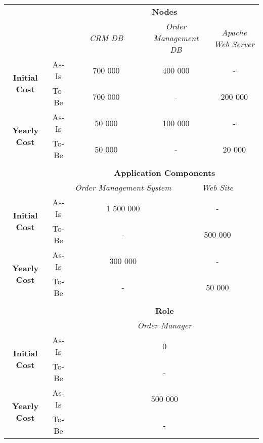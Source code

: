 \begin{table}[H]
	\centering
	\begin{tabular}{|c|c|p{2cm}|p{2.5cm}|p{2.5cm}|p{2.5cm}|}
		\cline{3-6}

		\multicolumn{2}{c}{} & \multicolumn{4}{|c|}{\textbf{Nodes}} \\ \cline{3-6}
		\multicolumn{2}{c|}{} & \multicolumn{1}{c|}{\textsl{CRM DB}} & \multicolumn{2}{c|}{\textsl{Order Management DB}}  & \multicolumn{1}{c|}{\textsl{Apache Web Server}}\\
		\hline
		\multirow{2}{*}{\textbf{Initial Cost}}& As-Is & \multicolumn{1}{c|}{700 000} & \multicolumn{2}{c|}{400 000} & \multicolumn{1}{c|}{-}  \\ \cline{2-6}
		& To-Be & \multicolumn{1}{c|}{700 000} & \multicolumn{2}{c|}{-} & \multicolumn{1}{c|}{200 000}  \\ \hline 
		\multirow{2}{*}{\textbf{Yearly Cost}}& As-Is & \multicolumn{1}{c|}{50 000} & \multicolumn{2}{c|}{100 000} & \multicolumn{1}{c|}{-}  \\ \cline{2-6}
		& To-Be & \multicolumn{1}{c|}{50 000} & \multicolumn{2}{c|}{-} & \multicolumn{1}{c|}{20 000}  \\ \hline 
		
		\multicolumn{6}{c}{} \\ \cline{3-6}
		\multicolumn{2}{c}{} & \multicolumn{4}{|c|}{\textbf{Application Components}} \\ \cline{3-6}
		\multicolumn{2}{c|}{} & \multicolumn{2}{c|}{\textsl{Order Management System}} & \multicolumn{2}{c|}{\textsl{Web Site}} \\
		\hline
		\multirow{2}{*}{\textbf{Initial Cost}}& As-Is & \multicolumn{2}{c|}{1 500 000} &  \multicolumn{2}{c|}{-}  \\ \cline{2-6}
		& To-Be &  \multicolumn{2}{c|}{-} & \multicolumn{2}{c|}{500 000}  \\ \hline 
		\multirow{2}{*}{\textbf{Yearly Cost}}& As-Is & \multicolumn{2}{c|}{300 000} & \multicolumn{2}{c|}{-}  \\ \cline{2-6}
		& To-Be & \multicolumn{2}{c|}{-} & \multicolumn{2}{c|}{50 000}  \\ \hline 

		\multicolumn{6}{c}{} \\ \cline{3-6}
		\multicolumn{2}{c}{} & \multicolumn{4}{|c|}{\textbf{Role}} \\ \cline{3-6}
		\multicolumn{2}{c|}{} & \multicolumn{4}{c|}{\textsl{Order Manager}} \\
		\hline
		\multirow{2}{*}{\textbf{Initial Cost}} &As-Is & \multicolumn{4}{c|}{0}  \\ \cline{2-6}
		& To-Be & \multicolumn{4}{c|}{-}\\ \hline		
		\multirow{2}{*}{\textbf{Yearly Cost}} &As-Is & \multicolumn{4}{c|}{500 000}  \\ \cline{2-6}
		& To-Be & \multicolumn{4}{c|}{-}\\ \hline


\end{tabular}
\end{table}
